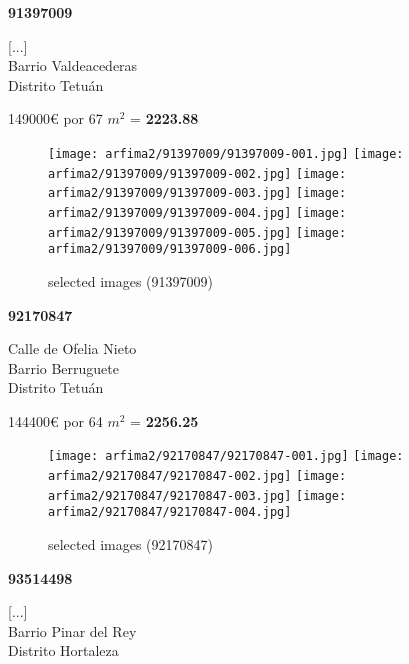 \documentclass[10pt,a4paper]{report}
\begin{document}
\newpage
\begin{center}
\begin{large}
\textbf{91397009}\\[10px]
\end{large}
[...]\\
Barrio Valdeacederas\\
Distrito Tetuán\\
\end{center}
{\large 149000€ por 67 $m^2$ = \color{blue} \textbf{2223.88}}
\begin{figure}[htbp]

\texttt{[image: arfima2/91397009/91397009-001.jpg]}
\texttt{[image: arfima2/91397009/91397009-002.jpg]}
\texttt{[image: arfima2/91397009/91397009-003.jpg]}
\texttt{[image: arfima2/91397009/91397009-004.jpg]}
\texttt{[image: arfima2/91397009/91397009-005.jpg]}
\texttt{[image: arfima2/91397009/91397009-006.jpg]}
\caption{selected images (91397009)}
\end{figure}
\newpage
\begin{center}
\begin{large}
\textbf{92170847}\\[10px]
\end{large}
Calle de Ofelia Nieto\\
Barrio Berruguete\\
Distrito Tetuán\\
\end{center}
{\large 144400€ por 64 $m^2$ = \color{blue} \textbf{2256.25}}
\begin{figure}[htbp]

\texttt{[image: arfima2/92170847/92170847-001.jpg]}
\texttt{[image: arfima2/92170847/92170847-002.jpg]}
\texttt{[image: arfima2/92170847/92170847-003.jpg]}
\texttt{[image: arfima2/92170847/92170847-004.jpg]}
\caption{selected images (92170847)}
\end{figure}
\newpage
\begin{center}
\begin{large}
\textbf{93514498}\\[10px]
\end{large}
[...]\\
Barrio Pinar del Rey\\
Distrito Hortaleza\\
\end{center}
\end{document}
